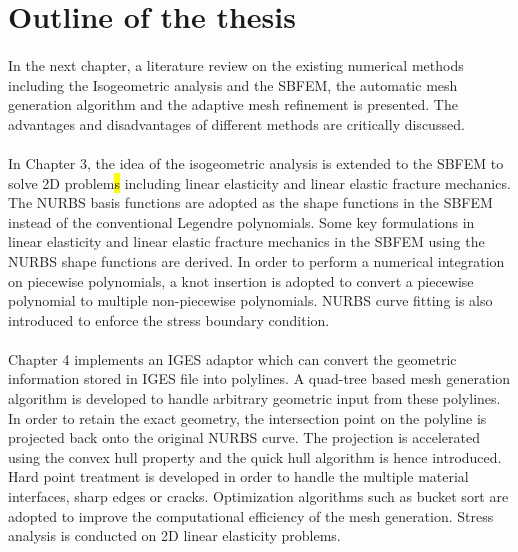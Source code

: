 \section{Outline of the thesis}
\paragraph{}
In the next chapter, a literature review on the existing numerical methods including the Isogeometric analysis and the SBFEM, the automatic mesh generation algorithm and the adaptive mesh refinement is presented.
The advantages and disadvantages of different methods are critically discussed.

\paragraph{}
In Chapter 3, the idea of the isogeometric analysis is extended to the SBFEM to solve 2D problem\hl{s} including linear elasticity and linear elastic fracture mechanics.
The NURBS basis functions are adopted as the shape functions in the SBFEM instead of the conventional Legendre polynomials.
Some key formulations in linear elasticity and linear elastic fracture mechanics in the SBFEM using the NURBS shape functions are derived.
In order to perform a numerical integration on piecewise polynomials, a knot insertion is adopted to convert a piecewise polynomial to multiple non-piecewise polynomials.
NURBS curve fitting is also introduced to enforce the stress boundary condition.

\paragraph{}
Chapter 4 implements an IGES adaptor which can convert the geometric information stored in IGES file into polylines.
A quad-tree based mesh generation algorithm is developed to handle arbitrary geometric input from these polylines.
In order to retain the exact geometry, the intersection point on the polyline is projected back onto the original NURBS curve.
The projection is accelerated using the convex hull property and the quick hull algorithm is hence introduced.
Hard point treatment is developed in order to handle the multiple material interfaces, sharp edges or cracks.
Optimization algorithms such as bucket sort are adopted to improve the computational efficiency of the mesh generation.
Stress analysis is conducted on 2D linear elasticity problems.


